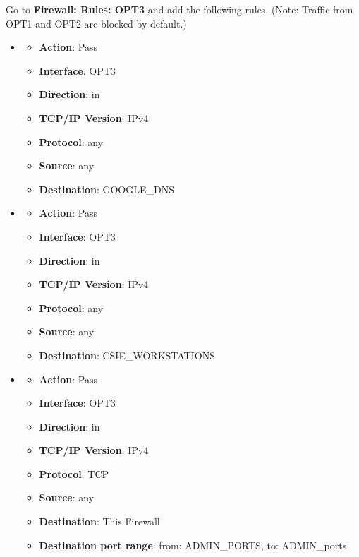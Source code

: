 \documentclass[12pt, a4paper]{article}
\begin{document}
\begin{enumerate}[resume]
    Go to \textbf{Firewall: Rules: OPT3} and add the following rules. (Note: Traffic from OPT1 and OPT2 are blocked by default.)
    \begin{itemize}
      \item
      \begin{itemize}
        \item \textbf{Action}: Pass
        \item \textbf{Interface}: OPT3
        \item \textbf{Direction}: in
        \item \textbf{TCP/IP Version}: IPv4
        \item \textbf{Protocol}: any
        \item \textbf{Source}: any
        \item \textbf{Destination}: GOOGLE\_DNS
      \end{itemize}
      \item
      \begin{itemize}
        \item \textbf{Action}: Pass
        \item \textbf{Interface}: OPT3
        \item \textbf{Direction}: in
        \item \textbf{TCP/IP Version}: IPv4
        \item \textbf{Protocol}: any
        \item \textbf{Source}: any
        \item \textbf{Destination}: CSIE\_WORKSTATIONS
      \end{itemize}
      \item
      \begin{itemize}
        \item \textbf{Action}: Pass
        \item \textbf{Interface}: OPT3
        \item \textbf{Direction}: in
        \item \textbf{TCP/IP Version}: IPv4
        \item \textbf{Protocol}: TCP
        \item \textbf{Source}: any
        \item \textbf{Destination}: This Firewall
        \item \textbf{Destination port range}: from: ADMIN\_PORTS, to: ADMIN\_ports
      \end{itemize}
    \end{itemize}


\end{enumerate}
\end{document}
